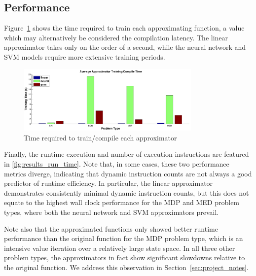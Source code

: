 \documentclass{article}
\begin{document}
\subsection{Performance}

Figure~\ref{fig:results_train_time} shows the time required to train each approximating function, a value which may alternatively be considered the compilation latency. The linear approximator takes only on the order of a second, while the neural network and SVM models require more extensive training periods.

\begin{figure}
  \centering
  \includegraphics[width=0.8\textwidth]{images/results_train_time_noorig}
  \caption{Time required to train/compile each approximator}
  \label{fig:results_train_time}
\end{figure}

Finally, the runtime execution and number of execution instructions are featured in \ref{fig:results_run_time}. Note that, in some cases, these two performance metrics diverge, indicating that dynamic instruction counts are not always a good predictor of runtime efficiency. In particular, the linear approximator demonstrates consistently minimal dynamic instruction counts, but this does not equate to the highest wall clock performance for the MDP and MED problem types, where both the neural network and SVM approximators prevail.

Note also that the approximated functions only showed better runtime performance than the original function for the MDP problem type, which is an intensive value iteration over a relatively large state space. In all three other problem types, the approximators in fact show significant slowdowns relative to the original function. We address this observation in Section~\ref{sec:project_notes}.
\end{document}
